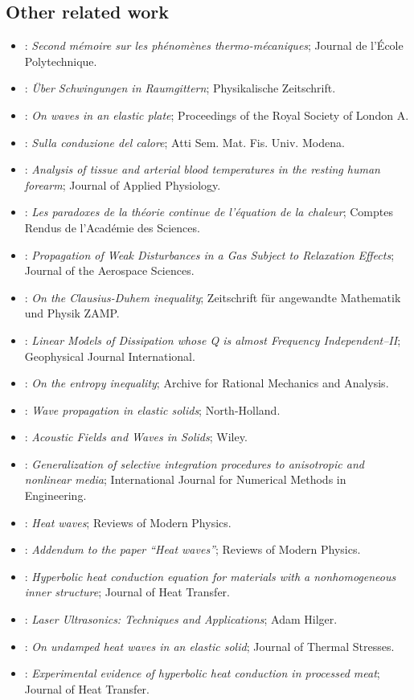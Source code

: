 \subsection{Other related work}
\begin{itemize}\itemsep0pt\small
\item \citet{Duhamel1837}: \emph{Second m\'emoire sur les ph\'enom\`enes thermo-m\'ecaniques}; Journal de l'\'Ecole Polytechnique.
\item \citet{BornKarman1912}: \emph{\"Uber Schwingungen in Raumgittern}; Physikalische Zeitschrift.
\item \citet{Lamb1917}: \emph{On waves in an elastic plate}; Proceedings of the Royal Society of London A.
\item \citet{Cattaneo1948}: \emph{Sulla conduzione del calore}; Atti Sem. Mat. Fis. Univ. Modena.
\item \citet{Pennes1948}: \emph{Analysis of tissue and arterial blood temperatures in the resting human forearm}; Journal of Applied Physiology.
\item \citet{Vernotte1958}: \emph{Les paradoxes de la th\'eorie continue de l'\'equation de la chaleur}; Comptes Rendus de l'Acad\'emie des Sciences.
\item \citet{MooreGibson1960}: \emph{Propagation of Weak Disturbances in a Gas Subject to Relaxation Effects}; Journal of the Aerospace Sciences.
\item \citet{GurtinWilliams1966}: \emph{On the Clausius-Duhem inequality}; Zeitschrift für angewandte Mathematik und Physik ZAMP.
\item \citet{Caputo1967}: \emph{Linear Models of Dissipation whose Q is almost Frequency Independent--II}; Geophysical Journal International.
\item \citet{Mueller1967}: \emph{On the entropy inequality}; Archive for Rational Mechanics and Analysis.
\item \citet{Achenbach1973}: \emph{Wave propagation in elastic solids}; North-Holland.
\item \citet{Auld1973}: \emph{Acoustic Fields and Waves in Solids}; Wiley.
\item \citet{Hughes1980}: \emph{Generalization of selective integration procedures to anisotropic and nonlinear media}; International Journal for Numerical Methods in Engineering.
\item \citet{Joseph1989}: \emph{Heat waves}; Reviews of Modern Physics.
\item \citet{Joseph1990}: \emph{Addendum to the paper ``Heat waves''}; Reviews of Modern Physics.
\item \citet{Kaminski1990}: \emph{Hyperbolic heat conduction equation for materials with a nonhomogeneous inner structure}; Journal of Heat Transfer.
\item \citet{Scruby1990}: \emph{Laser Ultrasonics: Techniques and Applications}; Adam Hilger.
\item \citet{GreenGN1992}: \emph{On undamped heat waves in an elastic solid}; Journal of Thermal Stresses.
\item \citet{Mitra1995}: \emph{Experimental evidence of hyperbolic heat conduction in processed meat}; Journal of Heat Transfer.
\end{itemize}
